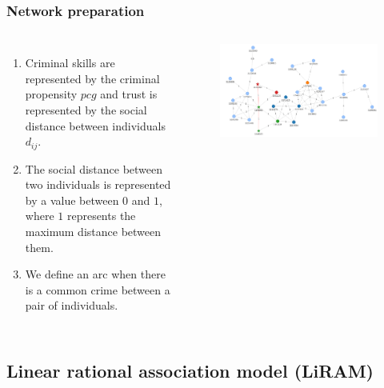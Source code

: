 \documentclass[aspectratio=169]{beamer}
\begin{document}
\begin{frame}
\frametitle{Network preparation}
  \begin{columns}
    \begin{enumerate}
      \item Criminal skills are represented by the criminal propensity $pcg$ and trust is represented by the social distance between individuals $d_{ij}$.
      \item The social distance between two individuals is represented by a value between $0$ and $1$, where $1$ represents the maximum distance between them.
      \item We define an arc when there is a common crime between a pair of individuals.
    \end{enumerate}
    \begin{figure}[ht]
      \centering
      \includegraphics[width=\textwidth]{images/network.png}
    \end{figure}
  \end{columns}
\end{frame}

\subsection{Linear rational association model (LiRAM)}
\end{document}
